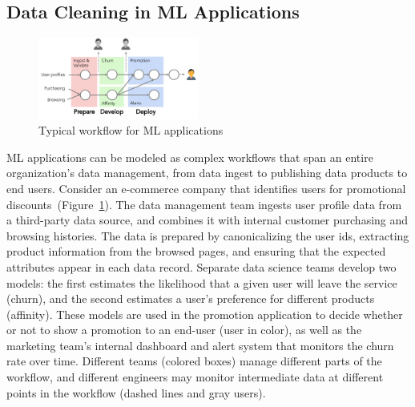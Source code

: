 \documentclass[11pt,dvipsnames]{article}
\begin{document}
\subsection{Data Cleaning in ML Applications}

\begin{figure}
	\centering
	\includegraphics[width={0.47\textwidth}]{submissions/cleaning-for-ml/images/mlworkflow.pdf}
	\vspace{-2.0em}
	\caption{Typical workflow for ML applications}
	\label{f:mlworkflow}
	
\end{figure}

ML applications can be modeled as complex workflows that span an entire organization's data management, from data ingest to publishing data products to end users.    Consider an e-commerce company that identifies users for promotional discounts~(Figure~\ref{f:mlworkflow}).   The data management team ingests user profile data from a third-party data source, and combines it with internal customer purchasing and browsing histories.  The data is prepared by canonicalizing the user ids, extracting product information from the browsed pages, and ensuring that the expected attributes appear in each data record.  Separate data science teams develop two models: the first estimates the likelihood that a given user will leave the service (churn), and the second estimates a user's preference for different products (affinity).  These models are used in the promotion application to decide whether or not to show a promotion to an end-user (user in color), as well as the marketing team's internal dashboard and alert system that monitors the churn rate over time.  Different teams (colored boxes) manage different parts of the workflow, and different engineers may monitor intermediate data at different points in the workflow (dashed lines and gray users).  
\end{document}
